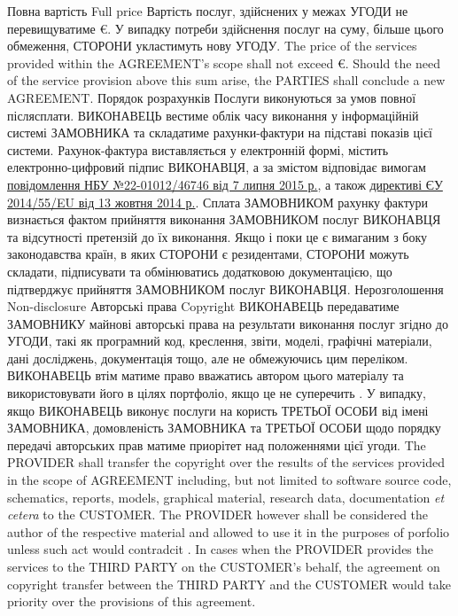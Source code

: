 \begin{Form}
\begin{paracol}{3}
        {}
        {}
      \clause
        {Повна вартість}
        {Full price}
        {}
        {Вартість послуг, здійснених у межах УГОДИ не перевищуватиме  €. У випадку потреби здійснення послуг на суму, більше цього обмеження, СТОРОНИ укластимуть нову УГОДУ.}
        {The price of the services provided within the AGREEMENT's scope shall not exceed  €. Should the need of the service provision above this sum arise, the PARTIES shall conclude a new AGREEMENT.}
        {}
      \clause %
        {Порядок розрахунків}
        {}
        {}
        {\label{sec:payment}Послуги виконуються за умов повної післясплати. ВИКОНАВЕЦЬ вестиме облік часу виконання у інформаційній системі ЗАМОВНИКА та складатиме рахунки-фактури на підставі показів цієї системи. Рахунок-фактура виставляється у електронній формі, містить електронно-цифровий підпис ВИКОНАВЦЯ, а за змістом відповідає вимогам \href{http://bank.gov.ua/doccatalog/document?id=19208488}{повідомлення НБУ №22-01012/46746 від 7 липня 2015 р.}, а також \href{http://eur-lex.europa.eu/legal-content/EN/TXT/?uri=CELEX:32014L0055}{директиві ЄУ 2014/55/EU від 13 жовтня 2014 р.}. Сплата ЗАМОВНИКОМ рахунку фактури визнається фактом прийняття виконання ЗАМОВНИКОМ послуг ВИКОНАВЦЯ та відсутності претензій до їх виконання. Якщо і поки це є вимаганим з боку законодавства країн, в яких СТОРОНИ є резидентами, СТОРОНИ можуть складати, підписувати та обмінюватись додатковою документацією, що підтверджує прийняття ЗАМОВНИКОМ послуг ВИКОНАВЦЯ.}
        {}
        {}
      \clause
        {Нерозголошення}
        {Non-disclosure}
        {}
        {\label{sec:nda}}
        {}
        {}
      \clause
        {Авторські права}
        {Copyright}
        {}
        {ВИКОНАВЕЦЬ передаватиме ЗАМОВНИКУ майнові авторські права на результати виконання послуг згідно до УГОДИ, такі як програмний код, креслення, звіти, моделі, графічні матеріали, дані досліджень, документація тощо, але не обмежуючись цим переліком. ВИКОНАВЕЦЬ втім матиме право вважатись автором цього матеріалу та використовувати його в цілях портфоліо, якщо це не суперечить . У випадку, якщо ВИКОНАВЕЦЬ виконує послуги на користь ТРЕТЬОЇ ОСОБИ від імені ЗАМОВНИКА, домовленість ЗАМОВНИКА та ТРЕТЬОЇ ОСОБИ щодо порядку передачі авторських прав матиме приорітет над положеннями цієї угоди.}
        {The PROVIDER shall transfer the copyright over the results of the services provided in the scope of AGREEMENT including, but not limited to software source code, schematics, reports, models, graphical material, research data, documentation \emph{et ce\-te\-ra} to the CUSTOMER. The PROVIDER however shall be considered the author of the respective material and allowed to use it in the purposes of porfolio unless such act would contradcit . In cases when the PROVIDER provides the services to the THIRD PARTY on the CUSTOMER's behalf, the agreement on copyright transfer between the THIRD PARTY and the CUSTOMER would take priority over the provisions of this agreement.}

\end{paracol}
\end{Form}
